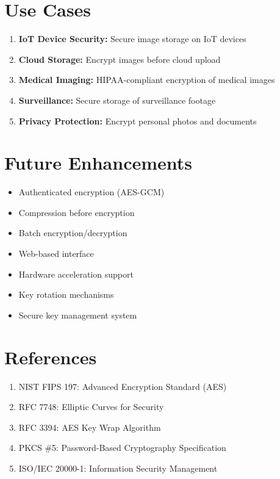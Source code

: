 \documentclass[12pt,a4paper]{report}
\begin{document}
\section{Use Cases}

\begin{enumerate}
    \item \textbf{IoT Device Security:} Secure image storage on IoT devices
    \item \textbf{Cloud Storage:} Encrypt images before cloud upload
    \item \textbf{Medical Imaging:} HIPAA-compliant encryption of medical images
    \item \textbf{Surveillance:} Secure storage of surveillance footage
    \item \textbf{Privacy Protection:} Encrypt personal photos and documents
\end{enumerate}

\section{Future Enhancements}

\begin{itemize}
    \item Authenticated encryption (AES-GCM)
    \item Compression before encryption
    \item Batch encryption/decryption
    \item Web-based interface
    \item Hardware acceleration support
    \item Key rotation mechanisms
    \item Secure key management system
\end{itemize}

\section{References}

\begin{enumerate}
    \item NIST FIPS 197: Advanced Encryption Standard (AES)
    \item RFC 7748: Elliptic Curves for Security
    \item RFC 3394: AES Key Wrap Algorithm
    \item PKCS \#5: Password-Based Cryptography Specification
    \item ISO/IEC 20000-1: Information Security Management
\end{enumerate}
\end{document}
